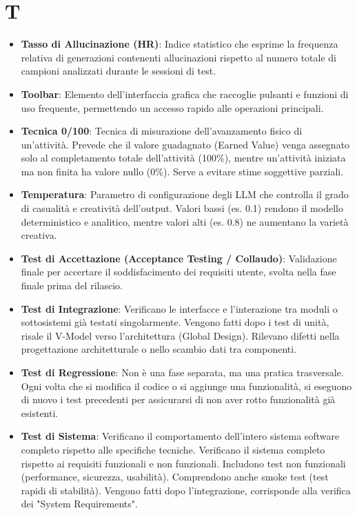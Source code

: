 \documentclass[11pt,a4paper]{article}
\begin{document}
\section*{T}
\begin{itemize}
\item \textbf{Tasso di Allucinazione (HR)}: Indice statistico che esprime la frequenza relativa di generazioni contenenti allucinazioni rispetto al numero totale di campioni analizzati durante le sessioni di test.

\item \textbf{Toolbar}: Elemento dell’interfaccia grafica che raccoglie pulsanti e funzioni di uso frequente, permettendo un accesso rapido alle operazioni principali.

\item \textbf{Tecnica 0/100}: Tecnica di misurazione dell'avanzamento fisico di un'attività. Prevede che il valore guadagnato (Earned Value) venga assegnato solo al completamento totale dell'attività (100\%), mentre un'attività iniziata ma non finita ha valore nullo (0\%). Serve a evitare stime soggettive parziali.

\item \textbf{Temperatura}: Parametro di configurazione degli LLM che controlla il grado di casualità e creatività dell'output. Valori bassi (es. 0.1) rendono il modello deterministico e analitico, mentre valori alti (es. 0.8) ne aumentano la varietà creativa.

\item \textbf{Test di Accettazione (Acceptance Testing / Collaudo)}: Validazione finale per accertare il soddisfacimento dei requisiti utente, svolta nella fase finale prima del rilascio.

\item \textbf{Test di Integrazione}: Verificano le interfacce e l'interazione tra moduli o sottosistemi già testati singolarmente. Vengono fatti dopo i test di unità, risale il V-Model verso l'architettura (Global Design). Rilevano difetti nella progettazione architetturale o nello scambio dati tra componenti.

\item \textbf{Test di Regressione}: Non è una fase separata, ma una pratica trasversale. Ogni volta che si modifica il codice o si aggiunge una funzionalità, si eseguono di nuovo i test precedenti per assicurarsi di non aver rotto funzionalità già esistenti.

\item \textbf{Test di Sistema}: Verificano il comportamento dell'intero sistema software completo rispetto alle specifiche tecniche. Verificano il sistema completo rispetto ai requisiti funzionali e non funzionali. Includono test non funzionali (performance, sicurezza, usabilità). Comprendono anche smoke test (test rapidi di stabilità). Vengono fatti dopo l'integrazione, corrisponde alla verifica dei "System Requirements".


\end{itemize}
\end{document}
